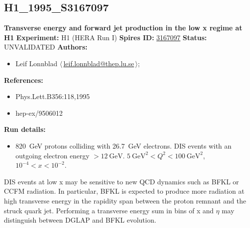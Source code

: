 \subsection[H1\_1995\_S3167097]{H1\_1995\_S3167097\,\cite{Aid:1995we}}
\textbf{Transverse energy and forward jet production in the low x regime at H1}\newline
\textbf{Experiment:} H1 (HERA Run I) \newline
\textbf{Spires ID:} \href{http://www.slac.stanford.edu/spires/find/hep/www?rawcmd=key+3167097}{3167097}\newline
\textbf{Status:} UNVALIDATED\newline
\textbf{Authors:}
\begin{itemize}
  \item Leif Lonnblad $\langle\,$\href{mailto:leif.lonnblad@thep.lu.se}{leif.lonnblad@thep.lu.se}$\,\rangle$;
\end{itemize}
\textbf{References:}
\begin{itemize}
  \item Phys.Lett.B356:118,1995
  \item hep-ex/9506012
\end{itemize}
\textbf{Run details:}
\begin{itemize}

  \item 820~GeV protons colliding with 26.7~GeV electrons. DIS events with an outgoing electron energy $> 12~\text{GeV}$. $5~\text{GeV}^2 < Q^2 < 100~\text{GeV}^2$, $10^{-4} < x < 10^{-2}$.\end{itemize}

\noindent DIS events at low x may be sensitive to new QCD dynamics such as BFKL or CCFM radiation. In particular, BFKL is expected to produce more radiation at high transverse energy  in the rapidity span between the proton remnant and the struck quark jet. Performing a transverse energy sum in bins of x and $\eta$ may distinguish between DGLAP and BFKL evolution.

\clearpage


\clearpage

